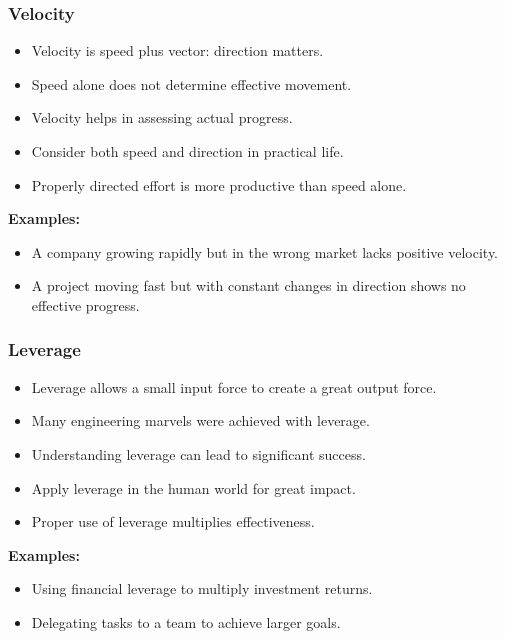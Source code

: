 \begin{frame}[fragile]\frametitle{Velocity}
\begin{itemize}
    \item Velocity is speed plus vector: direction matters.
    \item Speed alone does not determine effective movement.
    \item Velocity helps in assessing actual progress.
    \item Consider both speed and direction in practical life.
    \item Properly directed effort is more productive than speed alone.
\end{itemize}
\textbf{Examples:}
\begin{itemize}
    \item A company growing rapidly but in the wrong market lacks positive velocity.
    \item A project moving fast but with constant changes in direction shows no effective progress.
\end{itemize}
\end{frame}

\begin{frame}[fragile]\frametitle{Leverage}
\begin{itemize}
    \item Leverage allows a small input force to create a great output force.
    \item Many engineering marvels were achieved with leverage.
    \item Understanding leverage can lead to significant success.
    \item Apply leverage in the human world for great impact.
    \item Proper use of leverage multiplies effectiveness.
\end{itemize}
\textbf{Examples:}
\begin{itemize}
    \item Using financial leverage to multiply investment returns.
    \item Delegating tasks to a team to achieve larger goals.
\end{itemize}
\end{frame}

